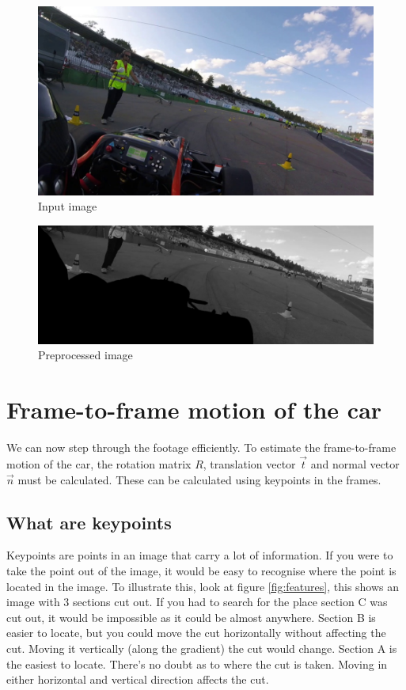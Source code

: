 \begin{figure}
    \centering
    \includegraphics[width=1\textwidth]{figures/input_image.jpg}
    \caption{Input image}
    \label{fig:input_image}
\end{figure}

\begin{figure}
    \centering
    \includegraphics[width=1\textwidth]{figures/output_image.jpg}
    \caption{Preprocessed image}
    \label{fig:output_image}
\end{figure}

\section{Frame-to-frame motion of the car}
We can now step through the footage efficiently. To estimate the frame-to-frame motion of the car, the rotation matrix ${R}$, translation vector $\vec{t}$ and normal vector $\vec{n}$ must be calculated. These can be calculated using keypoints in the frames. 

\subsection{What are keypoints}
Keypoints are points in an image that carry a lot of information. If you were to take the point out of the image, it would be easy to recognise where the point is located in the image. To illustrate this, look at figure \autoref{fig:features}, this shows an image with 3 sections cut out. If you had to search for the place section C was cut out, it would be impossible as it could be almost anywhere. Section B is easier to locate, but you could move the cut horizontally without affecting the cut. Moving it vertically (along the gradient) the cut would change. Section A is the easiest to locate. There's no doubt as to where the cut is taken. Moving in either horizontal and vertical direction affects the cut.\bigskip

